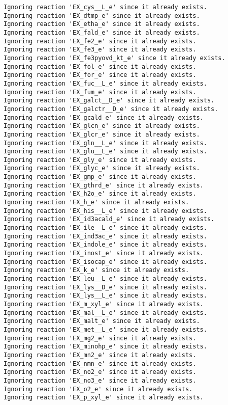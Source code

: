 \documentclass[
  letterpaper,
  DIV=11,
  numbers=noendperiod]{scrartcl}
\begin{document}
\begin{verbatim}
Ignoring reaction 'EX_cys__L_e' since it already exists.
Ignoring reaction 'EX_dtmp_e' since it already exists.
Ignoring reaction 'EX_etha_e' since it already exists.
Ignoring reaction 'EX_fald_e' since it already exists.
Ignoring reaction 'EX_fe2_e' since it already exists.
Ignoring reaction 'EX_fe3_e' since it already exists.
Ignoring reaction 'EX_fe3pyovd_kt_e' since it already exists.
Ignoring reaction 'EX_fol_e' since it already exists.
Ignoring reaction 'EX_for_e' since it already exists.
Ignoring reaction 'EX_fuc__L_e' since it already exists.
Ignoring reaction 'EX_fum_e' since it already exists.
Ignoring reaction 'EX_galct__D_e' since it already exists.
Ignoring reaction 'EX_galctr__D_e' since it already exists.
Ignoring reaction 'EX_gcald_e' since it already exists.
Ignoring reaction 'EX_glcn_e' since it already exists.
Ignoring reaction 'EX_glcr_e' since it already exists.
Ignoring reaction 'EX_gln__L_e' since it already exists.
Ignoring reaction 'EX_glu__L_e' since it already exists.
Ignoring reaction 'EX_gly_e' since it already exists.
Ignoring reaction 'EX_glyc_e' since it already exists.
Ignoring reaction 'EX_gmp_e' since it already exists.
Ignoring reaction 'EX_gthrd_e' since it already exists.
Ignoring reaction 'EX_h2o_e' since it already exists.
Ignoring reaction 'EX_h_e' since it already exists.
Ignoring reaction 'EX_his__L_e' since it already exists.
Ignoring reaction 'EX_id3acald_e' since it already exists.
Ignoring reaction 'EX_ile__L_e' since it already exists.
Ignoring reaction 'EX_ind3ac_e' since it already exists.
Ignoring reaction 'EX_indole_e' since it already exists.
Ignoring reaction 'EX_inost_e' since it already exists.
Ignoring reaction 'EX_isocap_e' since it already exists.
Ignoring reaction 'EX_k_e' since it already exists.
Ignoring reaction 'EX_leu__L_e' since it already exists.
Ignoring reaction 'EX_lys__D_e' since it already exists.
Ignoring reaction 'EX_lys__L_e' since it already exists.
Ignoring reaction 'EX_m_xyl_e' since it already exists.
Ignoring reaction 'EX_mal__L_e' since it already exists.
Ignoring reaction 'EX_malt_e' since it already exists.
Ignoring reaction 'EX_met__L_e' since it already exists.
Ignoring reaction 'EX_mg2_e' since it already exists.
Ignoring reaction 'EX_minohp_e' since it already exists.
Ignoring reaction 'EX_mn2_e' since it already exists.
Ignoring reaction 'EX_nmn_e' since it already exists.
Ignoring reaction 'EX_no2_e' since it already exists.
Ignoring reaction 'EX_no3_e' since it already exists.
Ignoring reaction 'EX_o2_e' since it already exists.
Ignoring reaction 'EX_p_xyl_e' since it already exists.

\end{verbatim}
\end{document}
